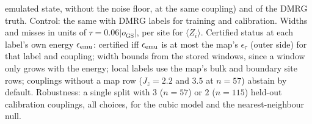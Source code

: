 \documentclass[aps,prx,onecolumn,10pt,nofootinbib,longbibliography,floatfix]{revtex4-2}
\theoremstyle{remark}
\newcommand{\Jz}{J_z}
\newcommand{\ms}{m_s}
\newcommand{\GS}{\mathrm{GS}}
\begin{document}
emulated state, without the noise floor, at the same coupling) and of the DMRG truth. Control: the same with DMRG
labels for training and calibration. Widths and misses in units of $\tau=0.06|o_\GS|$, per site for $\langle Z_i\rangle$. %
Certified status at each label's own energy $\epsilon_{\rm emu}$: certified iff $\epsilon_{\rm emu}$ is at most the
map's $\epsilon_\tau$ (outer side) for that label and coupling; width bounds from the stored windows, since a window
only grows with the energy; local labels use the map's bulk and boundary site rows; couplings without a map row
($\Jz=2.2$ and $3.5$ at $n=57$) abstain by default. Robustness: a single split with $3$ ($n=57$) or $2$ ($n=115$) held-out calibration couplings, all choices, for %
the cubic model and the nearest-neighbour null.

\def\SMcap{Learning test on emulated labels of the heavy-hex model. Standard conformal intervals at nominal level $0.9$, %
calibrated on held-out emulated labels (left block) or, as a control, on DMRG labels (right block). ``training
range'': each training coupling held out as test in turn; ``1.1--1.4'': the test range. Coverage of the new emulated %
site labels and of the true (DMRG) site labels and $\ms$; median width of the $\ms$ interval and range of its miss of the
true $\ms$, in units of $\tau$. The dataset paper's architecture~1 (our implementation) was run on the test range only.}\def\SMlab{tab:learn_emu} %
\LTclearhead

\end{document}

